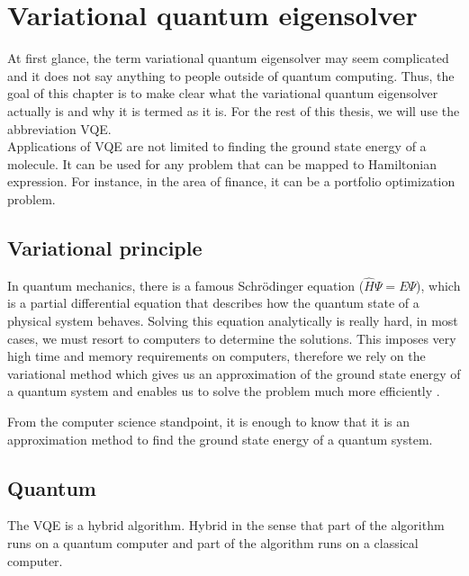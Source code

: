 \chapter{Variational quantum eigensolver}\label{ch:vqe}
At first glance, the term variational quantum eigensolver may seem complicated and it does not say anything to people outside of quantum computing. Thus, the goal of this chapter is to make clear what the variational quantum eigensolver actually is and why it is termed as it is. For the rest of this thesis, we will use the abbreviation VQE.\\

Applications of VQE are not limited to finding the ground state energy of a molecule. It can be used for any problem that can be mapped to Hamiltonian expression. For instance, in the area of finance, it can be a portfolio optimization problem. 

\section{Variational principle}
In quantum mechanics, there is a famous Schrödinger equation ($\hat{H} \Psi = E \Psi$), which is a partial differential equation that describes how the quantum state of a physical system behaves. Solving this equation analytically  is really hard, in most cases, we must resort to computers to determine the solutions. This imposes very high time and memory requirements on computers, therefore we rely on the variational method which gives us an approximation of the ground state energy of a quantum system and enables us to solve the problem much more efficiently \cite{Thijssen_2007}.

From the computer science standpoint, it is enough to know that it is an approximation method to find the ground state energy of a quantum system.
\section{Quantum}
The VQE is a hybrid algorithm. Hybrid in the sense that part of the algorithm runs on a quantum computer and part of the algorithm runs on a classical computer.  

